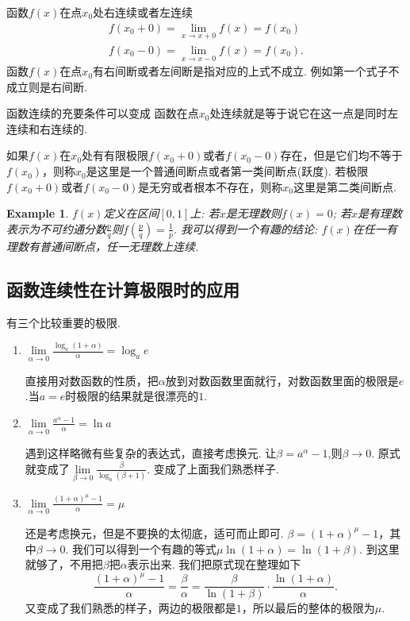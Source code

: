 \documentclass{article}
\newtheorem{example}[theorem]{Example}
\begin{document}
函数$f(x)$在点$x_0$处右连续或者左连续
\begin{align}
f(x_0+0) = \lim\limits_{x \rightarrow x+0} f(x) = f(x_0) \\
f(x_0-0) = \lim\limits_{x \rightarrow x-0} f(x) = f(x_0).
\end{align}
函数$f(x)$在点$x_0$有右间断或者左间断是指对应的上式不成立. 例如第一个式子不成立则是右间断.

函数连续的充要条件可以变成{\color{blue} 函数在点$x_0$处连续就是等于说它在这一点是同时左连续和右连续的}.

如果$f(x)$在$x_0$处有有限极限$f(x_0+0)$或者$f(x_0-0)$存在，但是它们均不等于$f(x_0)$，则称$x_0$是这里是一个普通间断点或者第一类间断点(跃度). 若极限$f(x_0+0)$或者$f(x_0-0)$是无穷或者根本不存在，则称$x_0$这里是第二类间断点.

\begin{example}
$f(x)$定义在区间$[0,1]$上: 若$x$是无理数则$f(x)=0$; 若$x$是有理数表示为不可约通分数$\frac{p}{q}$则$f(\frac{p}{q})=\frac{1}{p}$. 我可以得到一个有趣的结论: $f(x)$在任一有理数有普通间断点，任一无理数上连续.
\end{example}

\newpage
\subsection{函数连续性在计算极限时的应用}

有三个比较重要的极限.

\begin{enumerate}
	\item $\lim\limits_{\alpha \rightarrow 0} \frac{\log_a(1+\alpha)}{\alpha} = \log_a e$

直接用对数函数的性质，把$\alpha$放到对数函数里面就行，对数函数里面的极限是$e$.当$a=e$时极限的结果就是很漂亮的$1$.			
	
	\item $\lim\limits_{\alpha \rightarrow 0} \frac{a^\alpha-1}{\alpha} = \ln a$
	
遇到这样略微有些复杂的表达式，直接考虑换元. 让$\beta = a^\alpha -1$,则$\beta \rightarrow 0$. 原式就变成了$\lim\limits_{\beta \rightarrow 0} \frac{\beta}{\log_a(\beta+1)}$. 变成了上面我们熟悉样子.	
	
	\item $\lim\limits_{\alpha \rightarrow 0} \frac{(1+\alpha)^\mu-1}{\alpha} = \mu$
	
还是考虑换元，但是不要换的太彻底，适可而止即可. $\beta = (1+\alpha)^\mu - 1$，其中$\beta \rightarrow 0$. 我们可以得到一个有趣的等式$\mu \ln(1+\alpha) = \ln(1+\beta)$. 到这里就够了，不用把$\beta$把$\alpha$表示出来. 我们把原式现在整理如下\[\frac{(1+\alpha)^\mu-1}{\alpha} = \frac{\beta}{\alpha} = \frac{\beta}{\ln(1+\beta)}\cdot\frac{\ln(1+\alpha)}{\alpha}.\]又变成了我们熟悉的样子，两边的极限都是$1$，所以最后的整体的极限为$\mu$.	
\end{enumerate}
\end{document}
